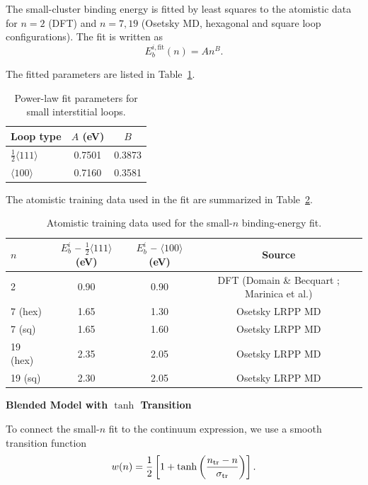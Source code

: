 \documentclass[pdflatex,sn-basic]{sn-jnl} %
\begin{document}
The small-cluster binding energy is fitted by least squares to the atomistic
data for \(n=2\) (DFT) and \(n=7,19\) (Osetsky MD, hexagonal and square loop
configurations). The fit is written as
\begin{equation}
E_b^{i,\mathrm{fit}}(n) = A n^B .
\label{eq:Eb_smalln_fit}
\end{equation}

The fitted parameters are listed in Table~\ref{tab:smalln_fit_params}.

\begin{table}[htbp]
\centering
\caption{Power-law fit parameters for small interstitial loops.}
\label{tab:smalln_fit_params}
\begin{tabular}{lcc}
\hline\hline
Loop type & \(A\) (eV) & \(B\) \\
\hline
\(\tfrac{1}{2}\langle 111 \rangle\) & 0.7501 & 0.3873 \\
\(\langle 100 \rangle\)             & 0.7160 & 0.3581 \\
\hline\hline
\end{tabular}
\end{table}

The atomistic training data used in the fit are summarized in
Table~\ref{tab:atomistic_training_data}.
\begin{table}[htbp]
\centering
\caption{Atomistic training data used for the small-\(n\) binding-energy fit.}
\label{tab:atomistic_training_data}
\begin{tabular}{lccc}
\hline\hline
\(n\) &
\(E_b^i\) -- \(\tfrac{1}{2}\langle 111 \rangle\) (eV) &
\(E_b^i\) -- \(\langle 100 \rangle\) (eV) &
Source \\
\hline
2          & 0.90 & 0.90 & DFT (Domain \& Becquart \cite{Domain2001}; Marinica et al.\cite{Marinica2011}) \\
7 (hex)    & 1.65 & 1.30 & Osetsky LRPP MD \\
7 (sq)     & 1.65 & 1.60 & Osetsky LRPP MD \\
19 (hex)   & 2.35 & 2.05 & Osetsky LRPP MD \\
19 (sq)    & 2.30 & 2.05 & Osetsky LRPP MD \\
\hline\hline
\end{tabular}
\end{table}
\newpage
\textbf{Blended Model with \texorpdfstring{$\tanh$}{tanh} Transition}

To connect the small-\(n\) fit to the continuum expression, we use a smooth
transition function
\begin{equation}
w(n)=\frac{1}{2}\left[1+\tanh\left(\frac{n_{\rm tr}-n}{\sigma_{\rm tr}}\right)\right].
\label{eq:weight_function}
\end{equation}
\end{document}
